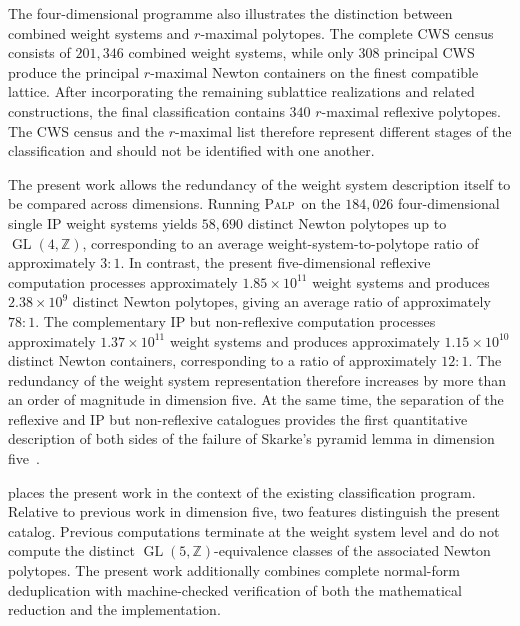 \documentclass[appliedmath,article,submit,moreauthors]{Definitions/mdpi}
\newcommand{\Z}{\mathbb{Z}}
\newcommand{\GL}{\operatorname{GL}}
\newcommand{\PALP}{\textsc{Palp}}
\begin{document}
The four-dimensional programme also illustrates the distinction between combined
weight systems and \(r\)-maximal polytopes. The complete CWS census consists of
\(201{,}346\) combined weight systems, while only \(308\) principal CWS produce
the principal \(r\)-maximal Newton containers on the finest compatible lattice.
After incorporating the remaining sublattice realizations and related
constructions, the final classification contains \(340\) \(r\)-maximal reflexive
polytopes. The CWS census and the \(r\)-maximal list therefore represent
different stages of the classification and should not be identified with one
another.

The present work allows the redundancy of the weight system description itself
to be compared across dimensions. Running \PALP\ on the \(184{,}026\)
four-dimensional single IP weight systems yields \(58{,}690\) distinct Newton
polytopes up to \(\GL(4,\Z)\), corresponding to an average
weight-system-to-polytope ratio of approximately \(3:1\). In contrast, the
present five-dimensional reflexive computation processes approximately
\(1.85\times10^{11}\) weight systems and produces \(2.38\times10^9\) distinct
Newton polytopes, giving an average ratio of approximately \(78:1\). The
complementary IP but non-reflexive computation processes approximately
\(1.37\times10^{11}\) weight systems and produces approximately
\(1.15\times10^{10}\) distinct Newton containers, corresponding to a ratio of
approximately \(12:1\). The redundancy of the weight system representation
therefore increases by more than an order of magnitude in dimension five. At the
same time, the separation of the reflexive and IP but non-reflexive catalogues
provides the first quantitative description of both sides of the failure of
Skarke's pyramid lemma in dimension five~\cite{Skarke1996}.

 places the present work in the context of the existing
classification program. Relative to previous work in dimension five, two
features distinguish the present catalog. Previous computations terminate at the
weight system level and do not compute the distinct \(\GL(5,\Z)\)-equivalence
classes of the associated Newton polytopes. The present work additionally
combines complete normal-form deduplication with machine-checked verification of
both the mathematical reduction and the implementation.
\end{document}
